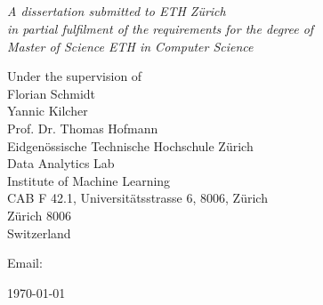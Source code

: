 \begin{titlepage} 

\begin{center}
\noindent
\huge
\dissertationtitle \\
\end{center}

\begin{center}
\noindent
\huge \\
\authorname \\
\Large
\authorcollege      \\[24pt]
\end{center}

\vspace{24pt} 
\begin{center}
\noindent
\large
{\it A dissertation submitted to ETH Zürich \\ 
in partial fulfilment of the requirements for the degree of \\ 
Master of Science ETH in Computer Science} 
\end{center}

\begin{center}
\noindent
Under the supervision of\\
Florian Schmidt\\
Yannic Kilcher \\
Prof. Dr. Thomas Hofmann \\[1in]
 
Eidgenössische Technische Hochschule Zürich \\
Data Analytics Lab     \\
Institute of Machine Learning  \\
CAB F 42.1, Universitätsstrasse 6, 8006, Zürich\\
Zürich 8006 \\
{\sc Switzerland}    \\
\end{center}

\begin{center}
\noindent
Email: \authoremail \\
\end{center}

\begin{center}
\noindent
\today
\end{center}

\end{titlepage} 

\newpage
\vspace*{\fill}
